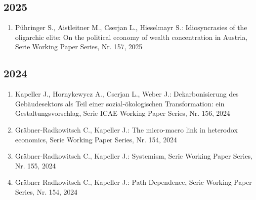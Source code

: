 \subsection*{2025}
\begin{enumerate}
    	 \item Pühringer S., Aistleitner M., Cserjan L., Hieselmayr S.: Idiosyncrasies of the oligarchic elite: On the political economy of wealth concentration in Austria, Serie Working Paper Series, Nr. 157, 2025
\end{enumerate}
\subsection*{2024}
\begin{enumerate}
    	 \item Kapeller J., Hornykewycz A., Cserjan L., Weber J.: Dekarbonisierung des Gebäudesektors als Teil einer sozial-ökologischen Transformation: ein Gestaltungsvorschlag, Serie ICAE Working Paper Series, Nr. 156, 2024
	 \item Gräbner-Radkowitsch C., Kapeller J.: The micro-macro link in heterodox economics, Serie Working Paper Series, Nr. 154, 2024
	 \item Gräbner-Radkowitsch C., Kapeller J.: Systemism, Serie Working Paper Series, Nr. 155, 2024
	 \item Gräbner-Radkowitsch C., Kapeller J.: Path Dependence, Serie Working Paper Series, Nr. 154, 2024
\end{enumerate}
